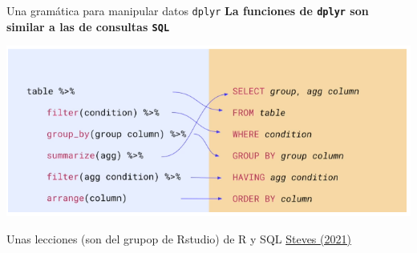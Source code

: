 \documentclass[
  ignorenonframetext,
  aspectratio=169]{beamer}
\begin{document}
\begin{frame}[fragile]{Una gramática para manipular datos
\texttt{dplyr}}
\label{una-gramuxe1tica-para-manipular-datos-dplyr-20}
\textbf{La funciones de \texttt{dplyr} son similar a las de consultas
\texttt{SQL}}

\begin{center}\includegraphics[width=0.7\linewidth]{Imgs/sql-tidyverse} \end{center}

Unas lecciones (son del grupop de Rstudio) de R y SQL
\href{https://www.rstudio.com/resources/rstudioglobal-2021/the-dynamic-duo-sql-and-r/}{Steves
(2021)}
\end{frame}
\end{document}
